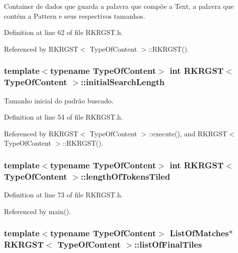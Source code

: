 Container de dados que guarda a palavra que compõe a Text, a palavra que contém a Pattern e seus respectivos tamanhos. 



Definition at line 62 of file R\+K\+R\+G\+S\+T.\+h.



Referenced by R\+K\+R\+G\+S\+T$<$ Type\+Of\+Content $>$\+::\+R\+K\+R\+G\+S\+T().

\hypertarget{classRKRGST_ad4e450cff7656afab26be8eb27c4f87c}{
\subsubsection[{initial\+Search\+Length}]{\setlength{\rightskip}{0pt plus 5cm}template$<$typename Type\+Of\+Content$>$ int {\bf R\+K\+R\+G\+S\+T}$<$ Type\+Of\+Content $>$\+::initial\+Search\+Length}}\label{classRKRGST_ad4e450cff7656afab26be8eb27c4f87c}


Tamanho inicial do padrão buscado. 



Definition at line 54 of file R\+K\+R\+G\+S\+T.\+h.



Referenced by R\+K\+R\+G\+S\+T$<$ Type\+Of\+Content $>$\+::execute(), and R\+K\+R\+G\+S\+T$<$ Type\+Of\+Content $>$\+::\+R\+K\+R\+G\+S\+T().

\hypertarget{classRKRGST_aaebf5b2da8490b6fc1ea06300914256e}{
\subsubsection[{length\+Of\+Tokens\+Tiled}]{\setlength{\rightskip}{0pt plus 5cm}template$<$typename Type\+Of\+Content$>$ int {\bf R\+K\+R\+G\+S\+T}$<$ Type\+Of\+Content $>$\+::length\+Of\+Tokens\+Tiled}}\label{classRKRGST_aaebf5b2da8490b6fc1ea06300914256e}


Definition at line 73 of file R\+K\+R\+G\+S\+T.\+h.



Referenced by main().

\hypertarget{classRKRGST_a1ae736b742c0cbcdd6d30c5201d4181b}{
\subsubsection[{list\+Of\+Final\+Tiles}]{\setlength{\rightskip}{0pt plus 5cm}template$<$typename Type\+Of\+Content$>$ {\bf List\+Of\+Matches}$\ast$ {\bf R\+K\+R\+G\+S\+T}$<$ Type\+Of\+Content $>$\+::list\+Of\+Final\+Tiles}}\label{classRKRGST_a1ae736b742c0cbcdd6d30c5201d4181b}


